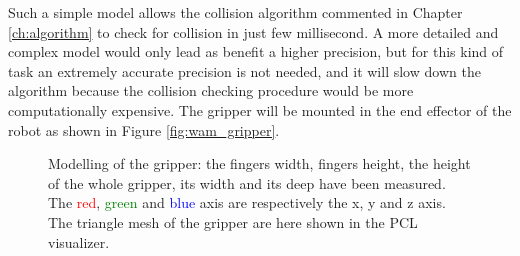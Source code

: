 Such a simple model allows the collision algorithm commented in Chapter \ref{ch:algorithm} to check for collision in just few millisecond. 
A more detailed and complex model would only lead as benefit a higher precision, but for this kind of task an extremely accurate precision is not needed, and it will slow down the algorithm because the collision checking procedure would be more computationally expensive. 
The gripper will be mounted in the end effector of the robot as shown in Figure \ref{fig:wam_gripper}. 


\begin{figure}[htp]
\centering
\begin{subfigure}[t]{0.25\textwidth}
\centering
{}
\end{subfigure} 
\begin{subfigure}[t]{0.3\textwidth}
\centering
{}
\end{subfigure}
\hspace{1cm}
\begin{subfigure}[t]{0.3\textwidth}
\centering
{}
\end{subfigure}
\caption{Modelling of the gripper: the fingers width, fingers height, the height of the whole gripper, its width and its deep have been measured. The \textcolor{red}{red}, \textcolor{green}{green} and \textcolor{blue}{blue} axis are respectively the x, y and z axis. The triangle mesh of the gripper are here shown in the PCL visualizer.}\label{fig:gripper_modelling}
\end{figure}


